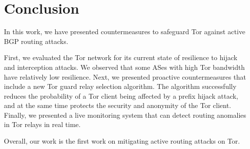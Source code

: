 \section{Conclusion}

In this work, we have presented countermeasures to safeguard Tor against active BGP routing attacks.

First, we evaluated the Tor network for its current state of resilience to hijack and interception attacks.  
We observed that some ASes with high Tor bandwidth have relatively low resilience.  Next, we presented proactive countermeasures that include a new Tor guard relay selection algorithm. The algorithm successfully reduces the probability of a Tor client being affected by a prefix hijack attack, and at the same time protects the security and anonymity of the Tor client. Finally, we presented a live monitoring system that can detect routing anomalies in Tor relays in real time. 

Overall, our work is the first work on mitigating active routing attacks on Tor. 
